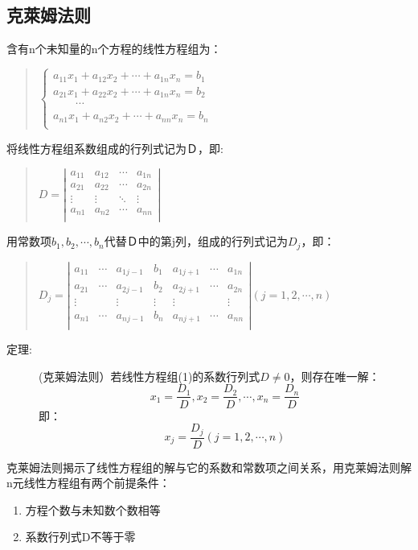 \documentclass[a4paper,10pt]{article}
\begin{document}
\begin{CJK}{UTF8}{song}
\section{克萊姆法则}
含有n个未知量的n个方程的线性方程组为：
\begin{quote}
\begin{math}
\left\{
\begin{array}{c}
a_{11}x_{1}+a_{12}x_{2}+\cdots{}+a_{1n}x_{n}=b_{1} \\
a_{21}x_{1}+a_{22}x_{2}+\cdots{}+a_{1n}x_{n}=b_{2} \\
\quad\quad \cdots{} \\
a_{n1}x_{1}+a_{n2}x_{2}+\cdots{}+a_{nn}x_{n}=b_{n} \\
\end{array} \right.
\end{math}
\end{quote}
将线性方程组系数组成的行列式记为Ｄ，即:
\begin{quote}
$D=
\left|\begin{array}{cccc}
a_{11}&a_{12}&\cdots{}&a_{1n} \\
a_{21}&a_{22}&\cdots{}&a_{2n} \\
\vdots&\vdots&\ddots{}&\vdots \\
a_{n1}&a_{n2}&\cdots{}&a_{nn} \\          
\end{array}\right| 
$
\end{quote}
用常数项$b_{1},b_{2},\cdots{},b_{n}$代替Ｄ中的第j列，组成的行列式记为$D_{j}$，即：
\begin{quote}
\begin{math}
D_{j}=\left|
\begin{array}{ccccccc}
a_{11}& \cdots{} & a_{1j-1} & b_{1} & a_{1j+1} & \cdots{} & a_{1n} \\
a_{21}& \cdots{} & a_{2j-1} & b_{2} & a_{2j+1} & \cdots{} & a_{2n} \\
\vdots{}&        & \vdots{} & \vdots{} & \vdots{} &       & \vdots{} \\
a_{n1}& \cdots{} & a_{nj-1} & b_{n} & a_{nj+1} & \cdots{} & a_{nn} \\
\end{array}\right| (j=1,2,\cdots{},n)
\end{math}
\end{quote}
\begin{description}
 \item[定理:](克莱姆法则）若线性方程组(1)的系数行列式$D\neq{}0$，则存在唯一解：
\begin{displaymath}
 x_{1}=\frac{D_{1}}{D},x_{2}=\frac{D_{2}}{D},\cdots{},x_{n}=\frac{D_{n}}{D}
\end{displaymath}
即：
\begin{displaymath}
x_{j}=\frac{D_{j}}{D} (j=1,2,\cdots{},n)
\end{displaymath}
\end{description}
克莱姆法则揭示了线性方程组的解与它的系数和常数项之间关系，用克莱姆法则解n元线性方程组有两个前提条件：
\begin{enumerate}
 \item 方程个数与未知数个数相等
\item 系数行列式D不等于零
\end{enumerate}


\end{CJK}
\end{document}

